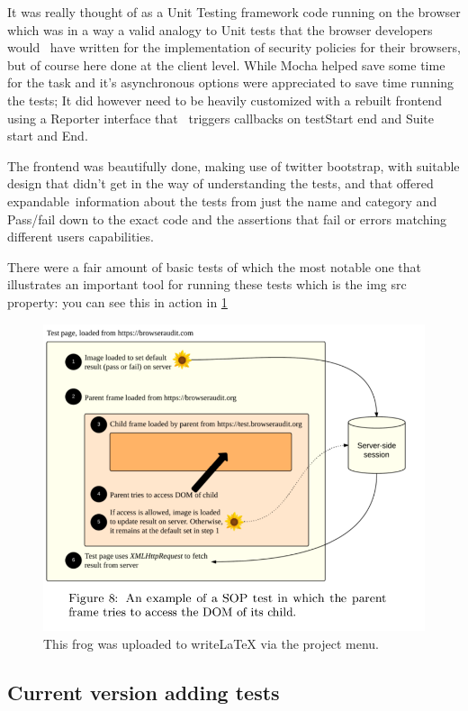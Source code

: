 \documentclass[a4paper,12pt]{paper}
\begin{document}
It was really thought of as a Unit Testing framework code running on the browser which was in a way a valid analogy to Unit tests that the browser developers would \
have written for the implementation of security policies for their browsers, but of course here done at the client level. While Mocha helped save some time for the task and
it's asynchronous options were appreciated to save time running the tests; It did however need to be heavily customized with a rebuilt frontend using a Reporter interface that \
triggers callbacks on testStart end and Suite start and End.\ 

The frontend was beautifully done, making use of twitter bootstrap, with suitable design that didn't get in the way of understanding the tests, and that offered expandable\
information about the tests from just the name and category and Pass/fail down to the exact code and the assertions that fail or errors matching different users capabilities.\

There were a fair amount of basic tests of which the most notable one that illustrates an important tool for running these tests which is the img src property:
you can see this in action in \ref{fig:sop} 

\begin{figure}
\centering
\includegraphics[width=1\textwidth]{./SOPbasic.png}
\caption{\label{fig:sop}This frog was uploaded to writeLaTeX via the project menu.}
\end{figure}



\subsection{Current version adding tests}
\end{document}
